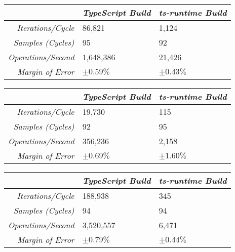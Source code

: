 \begin{center}
{
\centering
\tabulinesep=1.2mm
\setlength{\tabcolsep}{5mm}
\def\arraystretch{1.25}
\small
\begin{tabu} to \textwidth {|r||X[c,m]|X[c,m]|}
  \hline
  & \emph{TypeScript Build} & \emph{ts-runtime Build} \\
  \hline
  \hline
  \emph{Iterations/Cycle}  & 86,821 & 1,124 \\
  \hline
  \emph{Samples (Cycles)}  & 95 & 92 \\
  \hline
  \emph{Operations/Second} & 1,648,386 & 21,426 \\
  \hline
  \emph{Margin of Error}   & $\pm 0.59\%$ & $\pm 0.43\%$ \\
  \hline
\end{tabu}
}
\end{center}

\begin{center}
{
\centering
\tabulinesep=1.2mm
\setlength{\tabcolsep}{5mm}
\def\arraystretch{1.25}
\small
\begin{tabu} to \textwidth {|r||X[c,m]|X[c,m]|}
  \hline
  & \emph{TypeScript Build} & \emph{ts-runtime Build} \\
  \hline
  \hline
  \emph{Iterations/Cycle}  & 19,730 & 115 \\
  \hline
  \emph{Samples (Cycles)}  & 92 & 95 \\
  \hline
  \emph{Operations/Second} & 356,236 & 2,158 \\
  \hline
  \emph{Margin of Error}   & $\pm 0.69\%$ & $\pm 1.60\%$ \\
  \hline
\end{tabu}
}
\end{center}

\begin{center}
{
\centering
\tabulinesep=1.2mm
\setlength{\tabcolsep}{5mm}
\def\arraystretch{1.25}
\small
\begin{tabu} to \textwidth {|r||X[c,m]|X[c,m]|}
  \hline
  & \emph{TypeScript Build} & \emph{ts-runtime Build} \\
  \hline
  \hline
  \emph{Iterations/Cycle}  & 188,938 & 345 \\
  \hline
  \emph{Samples (Cycles)}  & 94 & 94 \\
  \hline
  \emph{Operations/Second} & 3,520,557 & 6,471 \\
  \hline
  \emph{Margin of Error}   & $\pm 0.79\%$ & $\pm 0.44\%$ \\
  \hline
\end{tabu}
}
\end{center}

